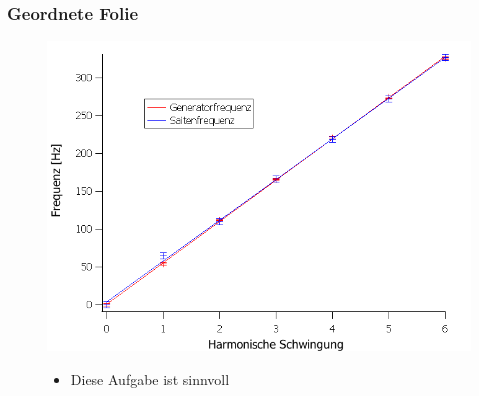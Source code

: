 \documentclass{beamer}
\begin{document}
\begin{frame}
\frametitle{Geordnete Folie}
  \begin{figure}
    \begin{minipage}{0.49\textwidth}
      \includegraphics[width=\textwidth]{Aufgabe1.png}
    \end{minipage}\pause
    \begin{minipage}{0.49\textwidth}
      \begin{itemize}
	\item Diese Aufgabe ist sinnvoll
      \end{itemize}
    \end{minipage}
  \end{figure}
\end{frame}
\end{document}
